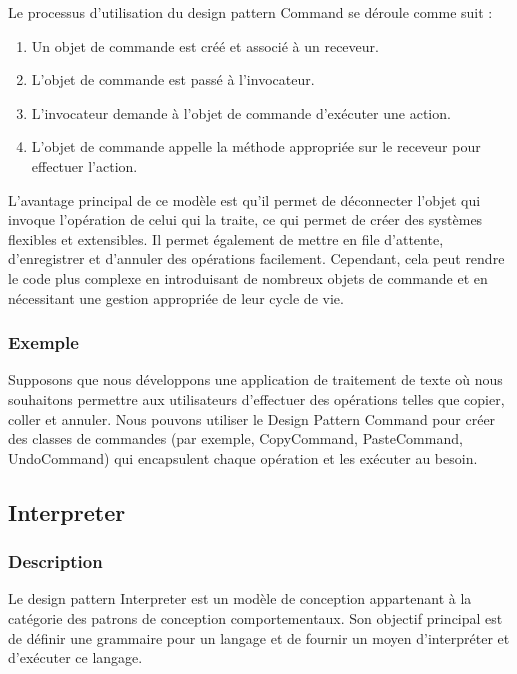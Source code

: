 \documentclass[french]{article}
\begin{document}
Le processus d'utilisation du design pattern Command se déroule comme suit :

\begin{enumerate}
    \item Un objet de commande est créé et associé à un receveur.
    \item L'objet de commande est passé à l'invocateur.
    \item L'invocateur demande à l'objet de commande d'exécuter une action.
    \item L'objet de commande appelle la méthode appropriée sur le receveur pour effectuer l'action.
\end{enumerate}

L'avantage principal de ce modèle est qu'il permet de déconnecter l'objet qui invoque l'opération de celui qui la traite, ce qui permet de créer des systèmes flexibles et extensibles. Il permet également de mettre en file d'attente, d'enregistrer et d'annuler des opérations facilement. Cependant, cela peut rendre le code plus complexe en introduisant de nombreux objets de commande et en nécessitant une gestion appropriée de leur cycle de vie.


\subsubsection{Exemple}

Supposons que nous développons une application de traitement de texte où nous souhaitons permettre aux utilisateurs d'effectuer des opérations telles que copier, coller et annuler. Nous pouvons utiliser le Design Pattern Command pour créer des classes de commandes (par exemple, CopyCommand, PasteCommand, UndoCommand) qui encapsulent chaque opération et les exécuter au besoin.




\newpage

\subsection{Interpreter}

\subsubsection{Description}

Le design pattern Interpreter est un modèle de conception appartenant à la catégorie des patrons de conception comportementaux. Son objectif principal est de définir une grammaire pour un langage et de fournir un moyen d'interpréter et d'exécuter ce langage.
\end{document}
